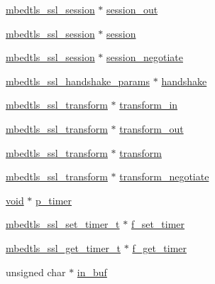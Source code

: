 \begin{DoxyCompactItemize}
\item 
\hyperlink{structmbedtls__ssl__session}{mbedtls\+\_\+ssl\+\_\+session} $\ast$ \hyperlink{structmbedtls__ssl__context_a9009145707b10147eb41df26eca9629c}{session\+\_\+out}
\item 
\hyperlink{structmbedtls__ssl__session}{mbedtls\+\_\+ssl\+\_\+session} $\ast$ \hyperlink{structmbedtls__ssl__context_a2fc6ea9a1b644ee70bada085f89e3746}{session}
\item 
\hyperlink{structmbedtls__ssl__session}{mbedtls\+\_\+ssl\+\_\+session} $\ast$ \hyperlink{structmbedtls__ssl__context_a73ef7682bfa0827d71b5788c5724e718}{session\+\_\+negotiate}
\item 
\hyperlink{structmbedtls__ssl__handshake__params}{mbedtls\+\_\+ssl\+\_\+handshake\+\_\+params} $\ast$ \hyperlink{structmbedtls__ssl__context_aca0569b7d5c02f79c47fdc964dcc7309}{handshake}
\item 
\hyperlink{structmbedtls__ssl__transform}{mbedtls\+\_\+ssl\+\_\+transform} $\ast$ \hyperlink{structmbedtls__ssl__context_ac7ca7e3d2ee75a1d38f6dc8014c789d1}{transform\+\_\+in}
\item 
\hyperlink{structmbedtls__ssl__transform}{mbedtls\+\_\+ssl\+\_\+transform} $\ast$ \hyperlink{structmbedtls__ssl__context_a06e77983fa7ce4de0ffcd9ae8a038cdf}{transform\+\_\+out}
\item 
\hyperlink{structmbedtls__ssl__transform}{mbedtls\+\_\+ssl\+\_\+transform} $\ast$ \hyperlink{structmbedtls__ssl__context_a501f615c5b6da6b21f666e913e96f343}{transform}
\item 
\hyperlink{structmbedtls__ssl__transform}{mbedtls\+\_\+ssl\+\_\+transform} $\ast$ \hyperlink{structmbedtls__ssl__context_adce09e981f24eb615a5450194750deb7}{transform\+\_\+negotiate}
\item 
\hyperlink{interfacevoid}{void} $\ast$ \hyperlink{structmbedtls__ssl__context_ae6aa3c32c60b630754aa03c6aab6a1b7}{p\+\_\+timer}
\item 
\hyperlink{ssl_8h_a61c5d9ed63c50ee809eec98820d3f36c}{mbedtls\+\_\+ssl\+\_\+set\+\_\+timer\+\_\+t} $\ast$ \hyperlink{structmbedtls__ssl__context_a1dd74017666428c62af5e05e46f0f8f1}{f\+\_\+set\+\_\+timer}
\item 
\hyperlink{ssl_8h_adea005600b532d788c05e9d01b42895b}{mbedtls\+\_\+ssl\+\_\+get\+\_\+timer\+\_\+t} $\ast$ \hyperlink{structmbedtls__ssl__context_a4c66906a1b5e82d84f67db66a695fa2c}{f\+\_\+get\+\_\+timer}
\item 
unsigned char $\ast$ \hyperlink{structmbedtls__ssl__context_a81a9c513f47631c198d74cbeb4d1999f}{in\+\_\+buf}
\item 

\end{DoxyCompactItemize}
